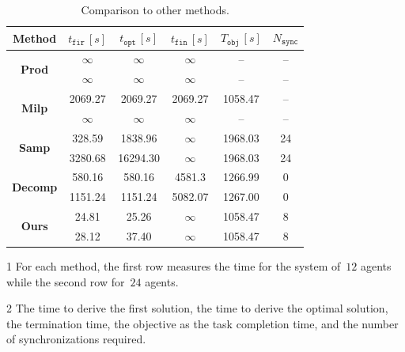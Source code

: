 \begin{table}\footnotesize
  \centering
  \begin{threeparttable}
	\caption{Comparison to other methods.}
	\label{table:compare_time}
	\begin{tabular}{|c|c|c|c|c|c|}\hline
	  \tnote{1} Method & \tnote{2} $t_{\texttt{fir}}\, [s]$
          & \tnote{2} $t_{\texttt{opt}}\, [s]$
	  & \tnote{2} $t_{\texttt{fin}}\,[s]$ & $T_{\texttt{obj}}\,[s]$
          & \tnote{2} $N_{\texttt{sync}}$ \\ \hline
		\multirow{2}{*}{\textbf{Prod}}& $\infty$ & $\infty$ & $\infty$ & -- & -- \\
                 & $\infty$ & $\infty$ & $\infty$ & -- & -- \\
                \hline
		\multirow{2}{*}{\textbf{Milp}} & 2069.27 & 2069.27 & 2069.27 & 1058.47 & -- \\
                &$\infty$ &$\infty$ & $\infty$ & -- & --  \\
                \hline
		\multirow{2}{*}{\textbf{Samp}} & 328.59 & 1838.96 & $\infty$ & 1968.03 & 24 \\
                 & 3280.68 &  16294.30 & $\infty$ & 1968.03 & 24 \\
                \hline
		\multirow{2}{*}{\textbf{Decomp}} & 580.16 & 580.16 & 4581.3 & 1266.99 & 0 \\
		 & 1151.24 & 1151.24 & 5082.07 & 1267.00 & 0 \\
                \hline
		\multirow{2}{*}{\textbf{Ours}} & 24.81 & 25.26 & $\infty$ & 1058.47 & 8 \\
                 & 28.12 & 37.40 & $\infty$ & 1058.47 & 8 \\
		\hline
	\end{tabular}
  \begin{tablenotes}
  \item[1] For each method, the first row  measures the time for the
    system of~$12$ agents while the second row for~$24$ agents.
  \item[2] The time to derive the first solution,
    the time to derive the optimal solution,
    the termination time, the objective as the task completion time,
and the number of synchronizations required.
  \end{tablenotes}
   \end{threeparttable}
\end{table}

